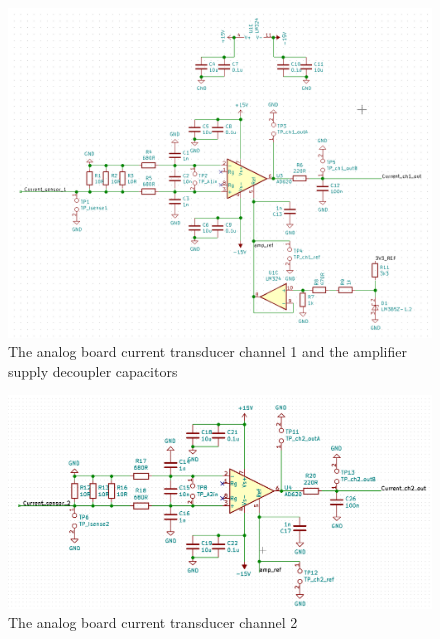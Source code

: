 \begin{figure} [H]
  \centering
  \includegraphics[width=\linewidth]{pictures/hardware/Analog_Interface_board/analog_ch1.png}
  \caption{The analog board current transducer channel 1 and the amplifier supply decoupler capacitors}
  \label{fig:analog_ch1}
\end{figure}

\begin{figure} [H]
  \centering
  \includegraphics[width=\linewidth]{pictures/hardware/Analog_Interface_board/analog_ch2.png}
  \caption{The analog board current transducer channel 2}
  \label{fig:analog_ch2}
\end{figure}

